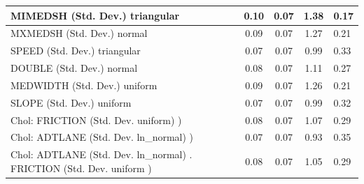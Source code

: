\begin{table}
\begin{center}
\begin{tabular}{|l|l|c|c|c|l|}
			\hline
			MIMEDSH (Std. Dev.) triangular &  & 0.10 & 0.07 & 1.38 & 0.17 \\
			\hline
			MXMEDSH (Std. Dev.) normal &  & 0.09 & 0.07 & 1.27 & 0.21 \\
			\hline
			SPEED (Std. Dev.) triangular &  & 0.07 & 0.07 & 0.99 & 0.33 \\
			\hline
			DOUBLE (Std. Dev.) normal &  & 0.08 & 0.07 & 1.11 & 0.27 \\
			\hline
			MEDWIDTH (Std. Dev.) uniform &  & 0.09 & 0.07 & 1.26 & 0.21 \\
			\hline
			SLOPE (Std. Dev.) uniform &  & 0.07 & 0.07 & 0.99 & 0.32 \\
			\hline
			 Chol: FRICTION (Std. Dev. uniform) ) &  & 0.08 & 0.07 & 1.07 & 0.29 \\
			\hline
			 Chol: ADTLANE (Std. Dev. ln_normal) ) &  & 0.07 & 0.07 & 0.93 & 0.35 \\
			\hline
			 Chol: ADTLANE (Std. Dev. ln_normal) . FRICTION (Std. Dev.   uniform ) &  & 0.08 & 0.07 & 1.05 & 0.29 \\
			\hline
		\end{tabular}
	\end{center}
\end{table}